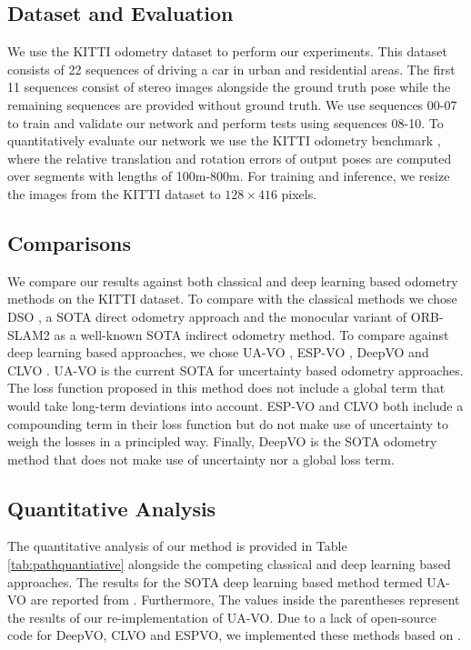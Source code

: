 \documentclass[letterpaper, 10 pt]{ieeeconf}  %
\begin{document}
\subsection{Dataset and Evaluation}
We use the KITTI odometry dataset to perform our experiments. This dataset consists of 22 sequences of driving a car in urban and residential areas. The first 11 sequences consist of stereo images alongside the ground truth pose while the remaining sequences are provided without ground truth. We use sequences 00-07 to train and validate our network and perform tests using sequences 08-10. To quantitatively evaluate our network we use the KITTI odometry benchmark \cite{geiger2012we}, where the relative translation and rotation errors of output poses are computed over segments with lengths of 100m-800m. For training and inference, we resize the images from the KITTI dataset to $128\times416$ pixels.

\subsection{Comparisons}
We compare our results against both classical and deep learning based odometry methods on the KITTI dataset. To compare with the classical methods we chose DSO \cite{engel2017direct}, a SOTA direct odometry approach and the monocular variant of ORB-SLAM2 \cite{mur2017orb} as a well-known SOTA indirect odometry method. To compare against deep learning based approaches, we chose UA-VO \cite{costante2020uncertainty}, ESP-VO \cite{wang2018end}, DeepVO \cite{wang2017deepvo} and CLVO \cite{saputra2019learning}. UA-VO is the current SOTA for uncertainty based odometry approaches. The loss function proposed in this method does not include a global term that would take long-term deviations into account. ESP-VO and CLVO both include a compounding term in their loss function but do not make use of uncertainty to weigh the losses in a principled way. Finally, DeepVO is the SOTA odometry method that does not make use of uncertainty nor a global loss term.

\subsection{Quantitative Analysis}
The quantitative analysis of our method is provided in Table \ref{tab:pathquantiative} alongside the competing classical and deep learning based approaches. The results for the SOTA deep learning based method termed UA-VO are reported from \cite{costante2020uncertainty}. Furthermore, The values inside the parentheses represent the results of our re-implementation of UA-VO. Due to a lack of open-source code for DeepVO, CLVO and ESPVO, we implemented these methods based on \cite{wang2017deepvo, wang2018end, saputra2019learning}. 
\end{document}
